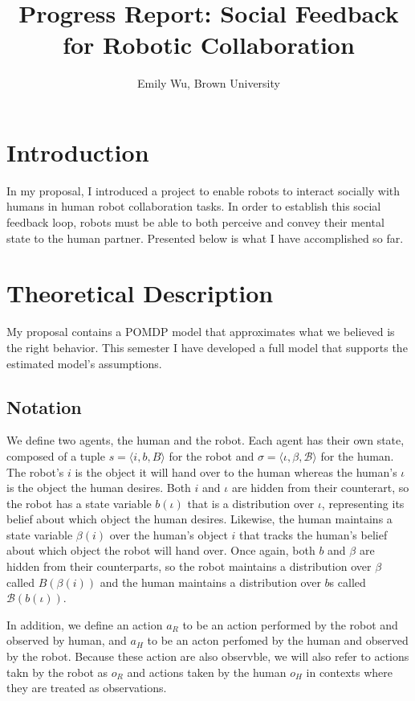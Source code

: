 \documentclass{article}
\title{Progress Report: Social Feedback for Robotic Collaboration}
\author{Emily Wu, Brown University}
\begin{document}
\maketitle

\section{Introduction} 

In my proposal, I introduced a project to enable robots to interact socially with humans in human robot collaboration tasks. In order to establish this social feedback loop, robots must be able to both perceive and convey their mental state to the human partner. Presented below is what I have accomplished so far. 

\section{Theoretical Description} 

My proposal contains a POMDP model that approximates what we believed is the right behavior. This semester I have developed a full model that supports the estimated model's assumptions. 

\subsection{Notation}

\newcommand{\Beta}{\mathcal{B}}
We define two agents, the human and the robot. Each agent has their own state, composed of a tuple $s = \langle i, b, B \rangle$ for the robot and $\sigma = \langle \iota, \beta, \Beta \rangle$ for the human. The robot's $i$ is the object it will hand over to the human whereas the human's $\iota$ is the object the human desires. Both $i$ and $\iota$ are hidden from their counterart, so the robot has a state variable $b(\iota)$ that is a distribution over $\iota$, representing its belief about which object the human desires. Likewise, the human maintains a state variable $\beta(i)$ over the human's object $i$ that tracks the human's belief about which object the robot will hand over. Once again, both $b$ and $\beta$ are hidden from their counterparts, so the robot maintains a distribution over $\beta$ called $B(\beta(i))$ and the human maintains a distribution over $b$s called $\Beta(b(\iota))$. 

In addition, we define an action $a_R$ to be an action performed by the robot and observed by human, and $a_H$ to be an acton perfomed by the human and observed by the robot. Because these action are also observble, we will also refer to actions takn by the robot as $o_R$ and actions taken by the human $o_H$ in contexts where they are treated as observations. 
\end{document}
